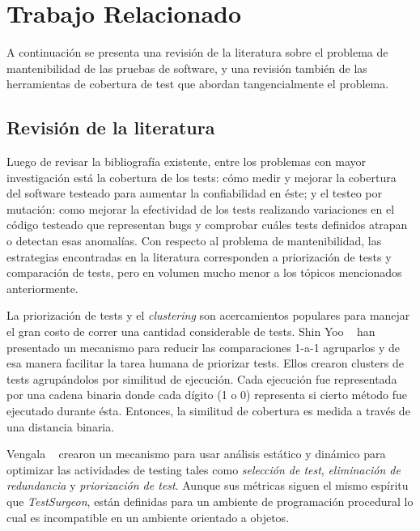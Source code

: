 \newpage

%
%
%
%

\section{Trabajo Relacionado}

\par A continuación se presenta una revisión de la literatura sobre el problema de mantenibilidad de las pruebas de software, y una revisión también de las herramientas de cobertura de test que abordan tangencialmente el problema.

\subsection{Revisión de la literatura}
\par Luego de revisar la bibliografía existente, entre los problemas con mayor investigación está la cobertura de los tests: cómo medir y mejorar la cobertura del software testeado para aumentar la confiabilidad en éste; y  el testeo por mutación: como mejorar la efectividad de los tests realizando variaciones en el código testeado que representan bugs y comprobar cuáles tests definidos atrapan o detectan esas anomalías. Con respecto al problema de mantenibilidad, las estrategias encontradas en la literatura corresponden a priorización de tests y comparación de tests, pero en volumen mucho menor a los tópicos mencionados anteriormente.

\par La priorización de tests y el \emph{clustering} son acercamientos populares para manejar el gran costo de correr una cantidad considerable de tests. Shin Yoo \etal~\cite{yoo2009clustering} han presentado un mecanismo para reducir las comparaciones 1-a-1 agruparlos y de esa manera facilitar la tarea humana de priorizar tests. Ellos crearon clusters de tests agrupándolos por similitud de ejecución. Cada ejecución fue representada por una cadena binaria donde cada dígito (1 o 0) representa si cierto método fue ejecutado durante ésta. Entonces, la similitud de cobertura es medida a través de una distancia binaria.

\par Vengala \etal~\cite{Vang09a} crearon un mecanismo para usar análisis estático y dinámico para optimizar las actividades de testing tales como \emph{selección de test}, \emph{eliminación de redundancia} y \emph{priorización de test}. Aunque sus métricas siguen el mismo espíritu que \emph{TestSurgeon}, están definidas para un ambiente de programación procedural lo cual es incompatible en un ambiente orientado a objetos.

